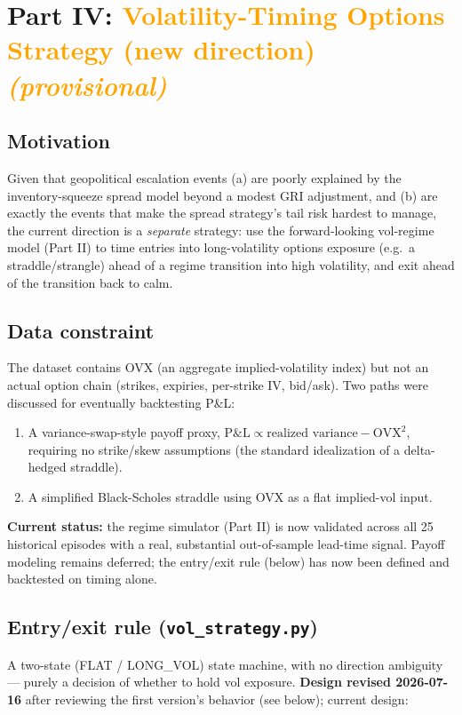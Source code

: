 \documentclass[11pt]{article}
\newcommand{\provisional}[1]{\textcolor{orange}{#1 \textit{(provisional)}}}
\begin{document}
\section{Part IV: \provisional{Volatility-Timing Options Strategy (new direction)}}

\subsection{Motivation}
Given that geopolitical escalation events (a) are poorly explained by the
inventory-squeeze spread model beyond a modest GRI adjustment, and (b) are
exactly the events that make the spread strategy's tail risk hardest to
manage, the current direction is a \emph{separate} strategy: use the
forward-looking vol-regime model (Part II) to time entries into
long-volatility options exposure (e.g.\ a straddle/strangle) ahead of a
regime transition into high volatility, and exit ahead of the transition
back to calm.

\subsection{Data constraint}
The dataset contains OVX (an aggregate implied-volatility index) but not an
actual option chain (strikes, expiries, per-strike IV, bid/ask). Two paths
were discussed for eventually backtesting P\&L:
\begin{enumerate}
  \item A variance-swap-style payoff proxy,
  $\text{P\&L} \propto \text{realized variance} - \text{OVX}^2$, requiring
  no strike/skew assumptions (the standard idealization of a delta-hedged
  straddle).
  \item A simplified Black-Scholes straddle using OVX as a flat implied-vol
  input.
\end{enumerate}
\textbf{Current status:} the regime simulator (Part II) is now validated
across all 25 historical episodes with a real, substantial out-of-sample
lead-time signal. Payoff modeling remains deferred; the entry/exit rule
(below) has now been defined and backtested on timing alone.

\subsection{Entry/exit rule (\texttt{vol\_strategy.py})}
A two-state (FLAT / LONG\_VOL) state machine, with no direction ambiguity
--- purely a decision of whether to hold vol exposure. \textbf{Design
revised 2026-07-16} after reviewing the first version's behavior (see
below); current design:
\end{document}
